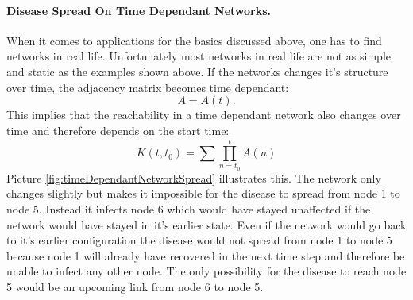 \paragraph{Disease Spread On Time Dependant Networks.}
When it comes to applications for the basics discussed above, one has to find networks in real life. Unfortunately most networks in real life are not as simple and static as the examples shown above. 
If the networks changes it's structure over time, the adjacency matrix becomes time dependant:
\begin{equation}
A = A(t).
\end{equation}
This implies that the reachability in a time dependant network also changes over time and therefore depends on the start time:
\begin{equation}
K(t,t_0) = \sum_{}^{}\prod_{n=t_0}^{t}A(n)
\end{equation}
Picture \ref{fig:timeDependantNetworkSpread} illustrates this. The network only changes slightly but makes it impossible for the disease to spread from node 1 to node 5. Instead it infects node 6 which would have stayed unaffected if the network would have stayed in it's earlier state. Even if the network would go back to it's earlier configuration the disease would not spread from node 1 to node 5 because node 1 will already have recovered in the next time step and therefore be unable to infect any other node. The only possibility for the disease to reach node 5 would be an upcoming link from node 6 to node 5.


